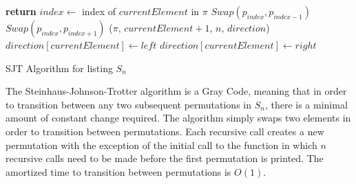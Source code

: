\begin{algorithm}
    \begin{algorithmic}[1]
                \State \textbf{return}
            \EndIf
                \State $index \gets $ index of $currentElement$ in $\pi$
                    \State $Swap(p_{index}, p_{index-1})$
                \Else 
                    \State $Swap(p_{index}, p_{index+1})$
                \EndIf
            \EndFor
            ($\pi$, $currentElement+1$, $n$, $direction$)
                \State $direction[currentElement] \gets left$
            \Else 
                \State $direction[currentElement] \gets right$
            \EndIf
        \EndFunction
        
    \end{algorithmic}
    \caption{SJT Algorithm for listing $S_{n}$}
    \label{Alg:SJT}
\end{algorithm}

The Steinhaus-Johnson-Trotter algorithm is a Gray Code, meaning that in order to transition 
between any two subsequent permutations in $S_{n}$, there is a minimal amount of constant 
change required. The algorithm simply swaps two elements in order to transition between 
permutations. Each recursive call creates a new permutation with the exception of the 
initial call to the function in which $n$ recursive calls need to be made before the 
first permutation is printed. The amortized time to transition between permutations is $O(1)$.




